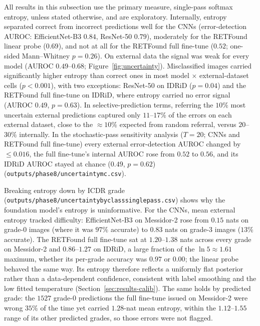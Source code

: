 \documentclass[journal]{IEEEtran}
\renewcommand{\_}{\origunderscore\allowbreak}
\begin{document}
All results in this subsection use the primary measure, single-pass softmax
entropy, unless stated otherwise, and are exploratory. Internally, entropy
separated correct from incorrect predictions well for the CNNs (error-detection
AUROC: EfficientNet-B3 $0.84$, ResNet-50 $0.79$), moderately for the RETFound
linear probe ($0.69$), and not at all for the RETFound full fine-tune ($0.52$;
one-sided Mann--Whitney $p=0.26$). On external data the signal was weak for every
model (AUROC $0.49$--$0.68$; Figure~\ref{fig:uncertainty}). Misclassified images
carried significantly higher entropy than correct ones in most model $\times$
external-dataset cells ($p<0.001$), with two exceptions: ResNet-50 on IDRiD
($p=0.04$) and the RETFound full fine-tune on IDRiD, where entropy carried no
error signal (AUROC $0.49$, $p=0.63$). In selective-prediction terms, referring
the $10\%$ most uncertain external predictions captured only $11$--$17\%$ of the
errors on each external dataset, close to the $\approx 10\%$ expected from random
referral, versus $20$--$30\%$ internally. In the stochastic-pass sensitivity
analysis ($T=20$; CNNs and RETFound full fine-tune) every external
error-detection AUROC changed by $\leq 0.016$, the full fine-tune's internal AUROC
rose from $0.52$ to $0.56$, and its IDRiD AUROC stayed at chance ($0.49$,
$p=0.62$) (\texttt{outputs/\allowbreak{}phase8/\allowbreak{}uncertainty\_mc.csv}).

Breaking entropy down by ICDR grade
(\texttt{outputs/\allowbreak{}phase8/\allowbreak{}uncertainty\_by\_class\_singlepass.csv}) shows why the
foundation model's entropy is uninformative. For the CNNs, mean external entropy
tracked difficulty: EfficientNet-B3 on Messidor-2 rose from $0.15$ nats on
grade-0 images (where it was $97\%$ accurate) to $0.83$ nats on grade-3 images
($13\%$ accurate). The RETFound full fine-tune sat at $1.20$--$1.38$ nats across
every grade on Messidor-2 and $0.86$--$1.27$ on IDRiD, a large fraction of the
$\ln 5\approx 1.61$ maximum, whether its per-grade accuracy was $0.97$ or $0.00$;
the linear probe behaved the same way. Its entropy therefore reflects a
uniformly flat posterior rather than a data-dependent confidence, consistent with
label smoothing and the low fitted temperature (Section~\ref{sec:results-calib}).
The same holds by predicted grade: the $1527$ grade-0 predictions the full
fine-tune issued on Messidor-2 were wrong $35\%$ of the time yet carried
$1.28$-nat mean entropy, within the $1.12$--$1.55$ range of its other predicted
grades, so those errors were not flagged.
\end{document}
